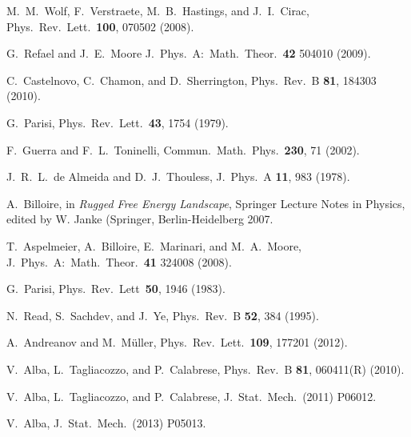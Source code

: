 \documentclass[twocolumn,superscriptaddress,prb,10pt]{revtex4-1}
\begin{document}
\begin{thebibliography}{99}
M.~M.~Wolf, F.~Verstraete, M.~B.~Hastings, and J.~I.~Cirac, Phys.\ Rev.\ Lett.\ 
{\bf 100}, 070502 (2008). 

G.~Refael and J.~E.~Moore J.\ Phys.\ A:\ Math.\ Theor.\ {\bf 42} 504010 (2009).

C.~Castelnovo, C.~Chamon, and D.~Sherrington, Phys.\ Rev.\ B {\bf 81}, 184303 (2010).

G.~Parisi, Phys.\ Rev.\ Lett.\ {\bf 43}, 1754 (1979).

F.~Guerra and F.~L.~Toninelli, Commun.\ Math.\ Phys.\ {\bf 230}, 71 (2002). 

J.~R.~L.~de Almeida and D.~J.~Thouless, J.\ Phys.\ A {\bf 11}, 983 (1978). 

A.~Billoire, in \emph{Rugged Free Energy Landscape}, Springer Lecture 
Notes in Physics, edited by W. Janke (Springer, Berlin-Heidelberg 
2007. 

T.~Aspelmeier, A.~Billoire, E.~Marinari, and M.~A.~Moore, 
J.\ Phys.\ A:\ Math.\ Theor.\ {\bf 41} 324008 (2008). 

G.~Parisi, Phys.\ Rev.\ Lett\ {\bf 50}, 1946 (1983). 

N.~Read, S.~Sachdev, and J.~Ye, Phys.\ Rev.\ B {\bf 52}, 384 (1995). 

A.~Andreanov and M.~M\"uller, Phys.\ Rev.\ Lett.\ {\bf 109}, 177201 (2012). 

V.~Alba, L.~Tagliacozzo, and P.~Calabrese, Phys.\ Rev.\ B {\bf 81}, 060411(R) (2010).

V.~Alba, L.~Tagliacozzo, and P.~Calabrese, J.\ Stat.\ Mech.\ (2011) P06012. 

V.~Alba, J.\ Stat.\ Mech.\ (2013) P05013. 














\end{thebibliography}
\end{document}
